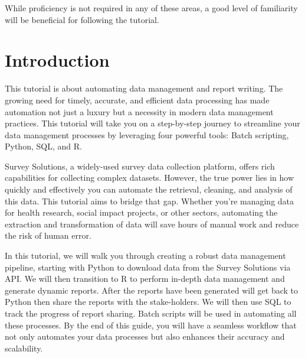 \documentclass[
  letterpaper,
  DIV=11,
  numbers=noendperiod]{scrreprt}
\begin{document}
\begin{tcolorbox}[enhanced jigsaw, colframe=quarto-callout-note-color-frame, rightrule=.15mm, title=\textcolor{quarto-callout-note-color}{\faInfo}\hspace{0.5em}{Note}, toprule=.15mm, coltitle=black, left=2mm, opacitybacktitle=0.6, colback=white, bottomrule=.15mm, leftrule=.75mm, opacityback=0, breakable, titlerule=0mm, bottomtitle=1mm, colbacktitle=quarto-callout-note-color!10!white, toptitle=1mm, arc=.35mm]

While proficiency is not required in any of these areas, a good level of
familiarity will be beneficial for following the tutorial.

\end{tcolorbox}


\chapter{Introduction}\label{introduction}

This tutorial is about automating data management and report writing.
The growing need for timely, accurate, and efficient data processing has
made automation not just a luxury but a necessity in modern data
management practices. This tutorial will take you on a step-by-step
journey to streamline your data management processes by leveraging four
powerful tools: Batch scripting, Python, SQL, and R.

Survey Solutions, a widely-used survey data collection platform, offers
rich capabilities for collecting complex datasets. However, the true
power lies in how quickly and effectively you can automate the
retrieval, cleaning, and analysis of this data. This tutorial aims to
bridge that gap. Whether you're managing data for health research,
social impact projects, or other sectors, automating the extraction and
transformation of data will save hours of manual work and reduce the
risk of human error.

In this tutorial, we will walk you through creating a robust data
management pipeline, starting with Python to download data from the
Survey Solutions via API. We will then transition to R to perform
in-depth data management and generate dynamic reports. After the reports
have been generated will get back to Python then share the reports with
the stake-holders. We will then use SQL to track the progress of report
sharing. Batch scripts will be used in automating all these processes.
By the end of this guide, you will have a seamless workflow that not
only automates your data processes but also enhances their accuracy and
scalability.
\end{document}
